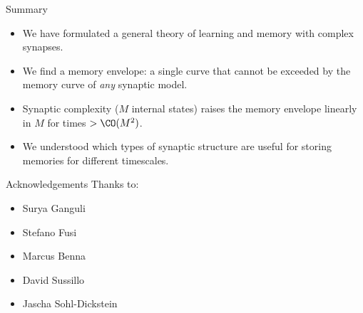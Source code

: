 \documentclass{beamer}%
\begin{document}
\begin{frame}{Summary}
%
  \begin{itemize}
    \item We have formulated a general theory of learning and memory with complex synapses.
    \item We find a memory envelope: a single curve that cannot be exceeded by the memory curve of \emph{any} synaptic model.
    \item Synaptic complexity ($M$ internal states) raises the memory envelope linearly in $M$ for times $> \CO(M^2)$.
    \item We understood which types of synaptic structure are useful for storing memories for different timescales.
  \end{itemize}

%
\end{frame}





%
%
%

\begin{frame}{Acknowledgements}
%
 Thanks to:
 \begin{itemize}
   \item Surya Ganguli
   \item Stefano Fusi
   \item Marcus Benna
   \item David Sussillo
   \item Jascha Sohl-Dickstein
 \end{itemize}
%
\end{frame}

\appendix
\end{document}
